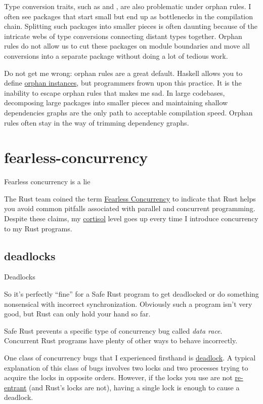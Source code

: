 \documentclass{article}
\begin{document}
Type conversion traits, such as  and , are also problematic under orphan rules.
I often see  packages that start small but end up as bottlenecks in the compilation chain.
Splitting such packages into smaller pieces is often daunting because of the intricate webs of type conversions connecting distant types together.
Orphan rules do not allow us to cut these packages on module boundaries and move all conversions into a separate package without doing a lot of tedious work.

Do not get me wrong: orphan rules are a great default.
Haskell allows you to define \href{https://wiki.haskell.org/Orphan_instance}{orphan instances}, but programmers frown upon this practice.
It is the inability to escape orphan rules that makes me sad.
In large codebases, decomposing large packages into smaller pieces and maintaining shallow dependencies graphs are the only path to acceptable compilation speed.
Orphan rules often stay in the way of trimming dependency graphs.

\section{fearless-concurrency}{Fearless concurrency is a lie}

The Rust team coined the term \href{https://blog.rust-lang.org/2015/04/10/Fearless-Concurrency.html}{Fearless Concurrency} to indicate that Rust helps you avoid common pitfalls associated with parallel and concurrent programming.
Despite these claims, my \href{https://en.wikipedia.org/wiki/Cortisol}{cortisol} level goes up every time I introduce concurrency to my Rust programs.

\subsection{deadlocks}{Deadlocks}
\epigraph{
    So it's perfectly ``fine'' for a Safe Rust program to get deadlocked or do something nonsensical with incorrect synchronization.
    Obviously such a program isn't very good, but Rust can only hold your hand so far.
}{}

Safe Rust prevents a specific type of concurrency bug called \emph{data race}.
Concurrent Rust programs have plenty of other ways to behave incorrectly.

One class of concurrency bugs that I experienced firsthand is \href{https://en.wikipedia.org/wiki/Deadlock}{deadlock}.
A typical explanation of this class of bugs involves two locks and two processes trying to acquire the locks in opposite orders.
However, if the locks you use are not \href{https://stackoverflow.com/questions/1312259/what-is-the-re-entrant-lock-and-concept-in-general}{re-entrant} (and Rust's locks are not), having a single lock is enough to cause a deadlock.
\end{document}
